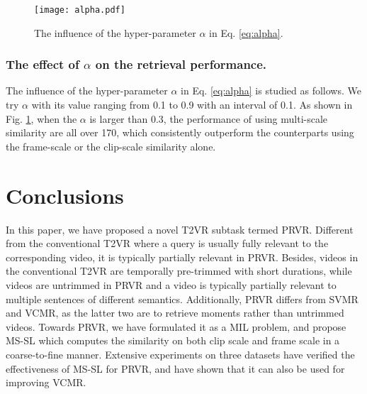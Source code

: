 \documentclass[sigconf]{acmart}
\begin{document}
\begin{figure}[tb!]
\centering\texttt{[image: alpha.pdf]}
\vspace{-4mm}
\caption{The influence of the hyper-parameter $\alpha$ in Eq. \ref{eq:alpha}.
}\label{fig:parameter_alpha}
\vspace{-4mm}
\end{figure}

\subsubsection{The effect of $\alpha$ on the retrieval performance.}
The influence of the hyper-parameter $\alpha$ in Eq. \ref{eq:alpha} is studied as follows. We try $\alpha$ with its value ranging from 0.1 to 0.9 with an interval of 0.1. As shown in Fig. \ref{fig:parameter_alpha}, when the $\alpha$ is larger than 0.3, the performance of using multi-scale similarity are all over 170, which consistently outperform the counterparts using the frame-scale or the clip-scale similarity alone. 


\section{Conclusions} \label{sec:conc}
In this paper, we have proposed a novel T2VR subtask termed PRVR.
Different from the conventional T2VR where a query is usually fully relevant to the corresponding video, it is typically partially relevant in PRVR. 
Besides, videos in the conventional T2VR are temporally pre-trimmed with short durations, while videos are untrimmed in PRVR and a video is typically partially relevant to multiple sentences of different semantics. 
Additionally, PRVR differs from SVMR and VCMR, as the latter two are to retrieve moments rather than untrimmed videos.
Towards PRVR, we have formulated it as a MIL problem, and propose MS-SL which computes the similarity on both clip scale and frame scale in a coarse-to-fine manner. Extensive experiments on three datasets have verified the effectiveness of MS-SL for PRVR, and have shown that it can also be used for improving VCMR.

\medskip
\end{document}
